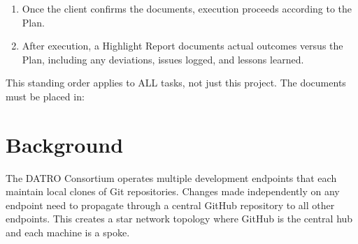 \documentclass[letterpaper,10pt,openany,oneside,english]{sphinxmanual}
\begin{document}
\begin{enumerate}
\begin{itemize}
\item {} 
\sphinxAtStartPar
Update  to the next semantic version

\item {} 
\sphinxAtStartPar
Apply the requested changes

\item {} 
\sphinxAtStartPar
Note: changes cascade downward \textendash{} a mandate change requires brief and
plan updates; a brief change requires plan updates; plan changes
are usually isolated

\end{itemize}

\item {} 
\sphinxAtStartPar
{} \sphinxhyphen{} Once the client confirms the documents, execution proceeds
according to the Plan.

\item {} 
\sphinxAtStartPar
{} \sphinxhyphen{} After execution, a Highlight Report documents
actual outcomes versus the Plan, including any deviations, issues logged,
and lessons learned.

\end{enumerate}

\sphinxAtStartPar
This standing order applies to ALL tasks, not just this project. The
documents must be placed in:

\sphinxstepscope


\section{Background}
\label{\detokenize{background:background}}\label{\detokenize{background::doc}}
\sphinxAtStartPar
The DATRO Consortium operates multiple development endpoints that each maintain local clones of Git repositories. Changes made independently on any endpoint need to propagate through a central GitHub repository to all other endpoints. This creates a star network topology where GitHub is the central hub and each machine is a spoke.
\end{document}

